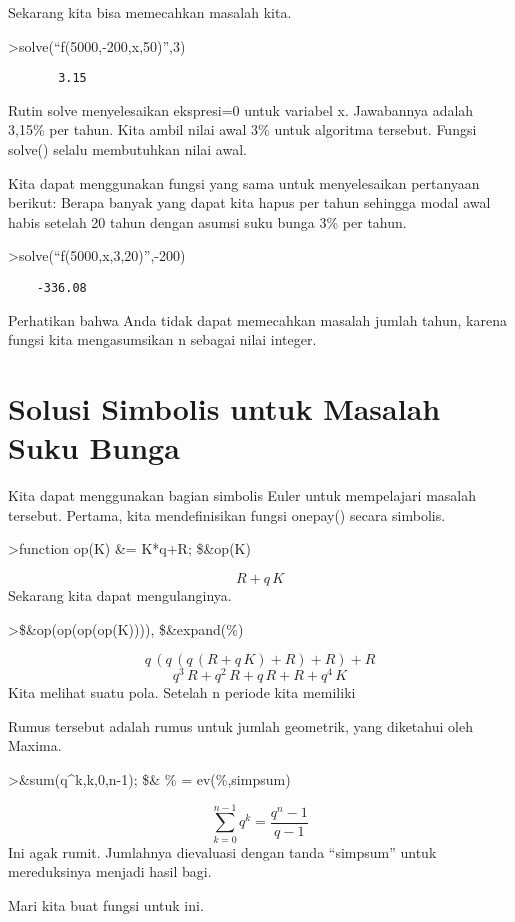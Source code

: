 \documentclass[
]{book}
\begin{document}
Sekarang kita bisa memecahkan masalah kita.

\textgreater solve(``f(5000,-200,x,50)'',3)

\begin{verbatim}
       3.15 
\end{verbatim}

Rutin solve menyelesaikan ekspresi=0 untuk variabel x. Jawabannya adalah 3,15\% per tahun. Kita ambil nilai awal 3\% untuk algoritma tersebut. Fungsi solve() selalu membutuhkan nilai awal.

Kita dapat menggunakan fungsi yang sama untuk menyelesaikan pertanyaan berikut: Berapa banyak yang dapat kita hapus per tahun sehingga modal awal habis setelah 20 tahun dengan asumsi suku bunga 3\% per tahun.

\textgreater solve(``f(5000,x,3,20)'',-200)

\begin{verbatim}
    -336.08 
\end{verbatim}

Perhatikan bahwa Anda tidak dapat memecahkan masalah jumlah tahun, karena fungsi kita mengasumsikan n sebagai nilai integer.

\section{Solusi Simbolis untuk Masalah Suku Bunga}\label{solusi-simbolis-untuk-masalah-suku-bunga}

Kita dapat menggunakan bagian simbolis Euler untuk mempelajari masalah tersebut. Pertama, kita mendefinisikan fungsi onepay() secara simbolis.

\textgreater function op(K) \&= K*q+R; \$\&op(K)

\[R+q\,K\]Sekarang kita dapat mengulanginya.

\textgreater\$\&op(op(op(op(K)))), \$\&expand(\%)

\[q\,\left(q\,\left(q\,\left(R+q\,K\right)+R\right)+R\right)+R\] \[q^3\,R+q^2\,R+q\,R+R+q^4\,K\]Kita melihat suatu pola. Setelah n periode kita memiliki

Rumus tersebut adalah rumus untuk jumlah geometrik, yang diketahui oleh Maxima.

\textgreater\&sum(q\^{}k,k,0,n-1); \$\& \% = ev(\%,simpsum)

\[\sum_{k=0}^{n-1}{q^{k}}=\frac{q^{n}-1}{q-1}\]Ini agak rumit. Jumlahnya dievaluasi dengan tanda ``simpsum'' untuk mereduksinya menjadi hasil bagi.

Mari kita buat fungsi untuk ini.
\end{document}
